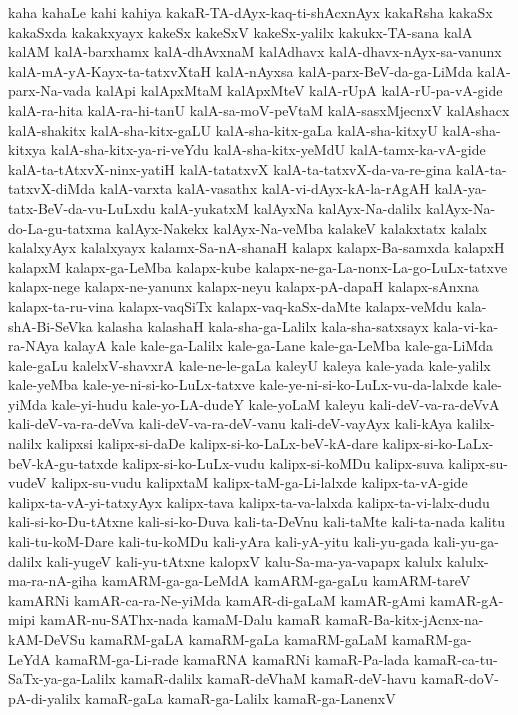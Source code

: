 {kaha
kahaLe
kahi
kahiya
kakaR-TA-dAyx-kaq-ti-shAcxnAyx
kakaRsha
kakaSx
kakaSxda
kakakxyayx
kakeSx
kakeSxV
kakeSx-yalilx
kakukx-TA-sana
kalA
kalAM
kalA-barxhamx
kalA-dhAvxnaM
kalAdhavx
kalA-dhavx-nAyx-sa-vanunx
kalA-mA-yA-Kayx-ta-tatxvXtaH
kalA-nAyxsa
kalA-parx-BeV-da-ga-LiMda
kalA-parx-Na-vada
kalApi
kalApxMtaM
kalApxMteV
kalA-rUpA
kalA-rU-pa-vA-gide
kalA-ra-hita
kalA-ra-hi-tanU
kalA-sa-moV-peVtaM
kalA-sasxMjecnxV
kalAshacx
kalA-shakitx
kalA-sha-kitx-gaLU
kalA-sha-kitx-gaLa
kalA-sha-kitxyU
kalA-sha-kitxya
kalA-sha-kitx-ya-ri-veYdu
kalA-sha-kitx-yeMdU
kalA-tamx-ka-vA-gide
kalA-ta-tAtxvX-ninx-yatiH
kalA-tatatxvX
kalA-ta-tatxvX-da-va-re-gina
kalA-ta-tatxvX-diMda
kalA-varxta
kalA-vasathx
kalA-vi-dAyx-kA-la-rAgAH
kalA-ya-tatx-BeV-da-vu-LuLxdu
kalA-yukatxM
kalAyxNa
kalAyx-Na-dalilx
kalAyx-Na-do-La-gu-tatxma
kalAyx-Nakekx
kalAyx-Na-veMba
kalakeV
kalakxtatx
kalalx
kalalxyAyx
kalalxyayx
kalamx-Sa-nA-shanaH
kalapx
kalapx-Ba-samxda
kalapxH
kalapxM
kalapx-ga-LeMba
kalapx-kube
kalapx-ne-ga-La-nonx-La-go-LuLx-tatxve
kalapx-nege
kalapx-ne-yanunx
kalapx-neyu
kalapx-pA-dapaH
kalapx-sAnxna
kalapx-ta-ru-vina
kalapx-vaqSiTx
kalapx-vaq-kaSx-daMte
kalapx-veMdu
kala-shA-Bi-SeVka
kalasha
kalashaH
kala-sha-ga-Lalilx
kala-sha-satxsayx
kala-vi-ka-ra-NAya
kalayA
kale
kale-ga-Lalilx
kale-ga-Lane
kale-ga-LeMba
kale-ga-LiMda
kale-gaLu
kalelxV-shavxrA
kale-ne-le-gaLa
kaleyU
kaleya
kale-yada
kale-yalilx
kale-yeMba
kale-ye-ni-si-ko-LuLx-tatxve
kale-ye-ni-si-ko-LuLx-vu-da-lalxde
kale-yiMda
kale-yi-hudu
kale-yo-LA-dudeY
kale-yoLaM
kaleyu
kali-deV-va-ra-deVvA
kali-deV-va-ra-deVva
kali-deV-va-ra-deV-vanu
kali-deV-vayAyx
kali-kAya
kalilx-nalilx
kalipxsi
kalipx-si-daDe
kalipx-si-ko-LaLx-beV-kA-dare
kalipx-si-ko-LaLx-beV-kA-gu-tatxde
kalipx-si-ko-LuLx-vudu
kalipx-si-koMDu
kalipx-suva
kalipx-su-vudeV
kalipx-su-vudu
kalipxtaM
kalipx-taM-ga-Li-lalxde
kalipx-ta-vA-gide
kalipx-ta-vA-yi-tatxyAyx
kalipx-tava
kalipx-ta-va-lalxda
kalipx-ta-vi-lalx-dudu
kali-si-ko-Du-tAtxne
kali-si-ko-Duva
kali-ta-DeVnu
kali-taMte
kali-ta-nada
kalitu
kali-tu-koM-Dare
kali-tu-koMDu
kali-yAra
kali-yA-yitu
kali-yu-gada
kali-yu-ga-dalilx
kali-yugeV
kali-yu-tAtxne
kalopxV
kalu-Sa-ma-ya-vapapx
kalulx
kalulx-ma-ra-nA-giha
kamARM-ga-ga-LeMdA
kamARM-ga-gaLu
kamARM-tareV
kamARNi
kamAR-ca-ra-Ne-yiMda
kamAR-di-gaLaM
kamAR-gAmi
kamAR-gA-mipi
kamAR-nu-SAThx-nada
kamaM-Dalu
kamaR
kamaR-Ba-kitx-jAcnx-na-kAM-DeVSu
kamaRM-gaLA
kamaRM-gaLa
kamaRM-gaLaM
kamaRM-ga-LeYdA
kamaRM-ga-Li-rade
kamaRNA
kamaRNi
kamaR-Pa-lada
kamaR-ca-tu-SaTx-ya-ga-Lalilx
kamaR-dalilx
kamaR-deVhaM
kamaR-deV-havu
kamaR-doV-pA-di-yalilx
kamaR-gaLa
kamaR-ga-Lalilx
kamaR-ga-LanenxV
}
